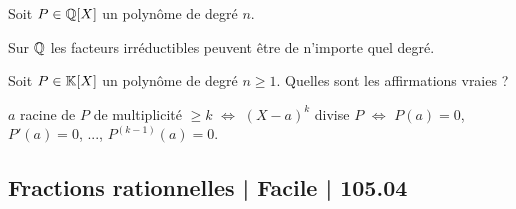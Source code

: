 \begin{question}
Soit $P \in \mathbb{Q}[X]$ un polynôme de degré $n$.
\begin{answers}



\end{answers}
\begin{explanations}
Sur $\mathbb{Q}$ les facteurs irréductibles peuvent être de n'importe quel degré.
\end{explanations}
\end{question}



\begin{question}
Soit $P \in \mathbb{K}[X]$ un polynôme de degré $n\ge1$.
Quelles sont les affirmations vraies ?
\begin{answers}

    

   
\end{answers}
\begin{explanations}
$a$ racine de $P$ de multiplicité $\ge k$ $\iff$ $(X-a)^k$ divise $P$ $\iff$ $P(a) = 0$, $P'(a)=0$, ..., $P^{(k-1)}(a)=0$.
\end{explanations}
\end{question}

\subsection{Fractions rationnelles | Facile | 105.04}

